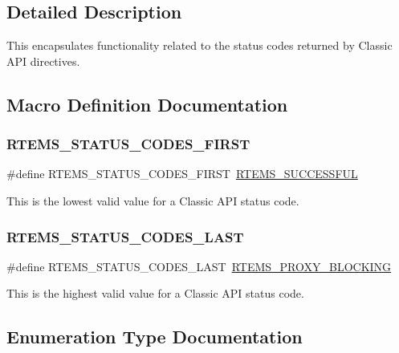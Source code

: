 \subsection{Detailed Description}
This encapsulates functionality related to the status codes returned by Classic A\+PI directives. 

\subsection{Macro Definition Documentation}
\mbox{\label{group__ClassicStatus_gacfe68f6d8aa7565fb918df4a816813c3}} 
\subsubsection{\texorpdfstring{RTEMS\_STATUS\_CODES\_FIRST}{RTEMS\_STATUS\_CODES\_FIRST}}
{\footnotesize\ttfamily \#define R\+T\+E\+M\+S\+\_\+\+S\+T\+A\+T\+U\+S\+\_\+\+C\+O\+D\+E\+S\+\_\+\+F\+I\+R\+ST~\mbox{\hyperlink{group__ClassicStatus_gga545d41846817eaba6143d52ee4d9e9fea8a23e2d94778f09399da984d73562536}{R\+T\+E\+M\+S\+\_\+\+S\+U\+C\+C\+E\+S\+S\+F\+UL}}}

This is the lowest valid value for a Classic A\+PI status code. \mbox{\label{group__ClassicStatus_ga4affdaeaa9782b37d646cd918753cc12}} 
\subsubsection{\texorpdfstring{RTEMS\_STATUS\_CODES\_LAST}{RTEMS\_STATUS\_CODES\_LAST}}
{\footnotesize\ttfamily \#define R\+T\+E\+M\+S\+\_\+\+S\+T\+A\+T\+U\+S\+\_\+\+C\+O\+D\+E\+S\+\_\+\+L\+A\+ST~\mbox{\hyperlink{group__ClassicStatus_gga545d41846817eaba6143d52ee4d9e9fea2456007f9975a9eea5387e21a4459ea8}{R\+T\+E\+M\+S\+\_\+\+P\+R\+O\+X\+Y\+\_\+\+B\+L\+O\+C\+K\+I\+NG}}}

This is the highest valid value for a Classic A\+PI status code. 

\subsection{Enumeration Type Documentation}
\mbox{\label{group__ClassicStatus_ga545d41846817eaba6143d52ee4d9e9fe}} 
